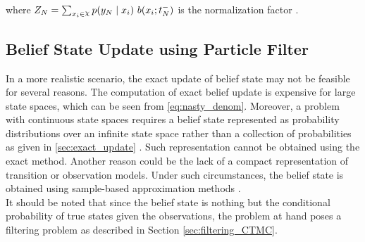 where $ Z_{N} = \sum_{x_{i}\in \rchi} p(y_{N} \mid x_{i})\ b(x_{i}; t_{N}^{-}) $ is the normalization factor \cite{article}.

\subsection{Belief State Update using Particle Filter}
\label{sec:particle_filter}
In a more realistic scenario, the exact update of belief state may not be feasible for several reasons. The computation of exact belief update is expensive for large state spaces, which can be seen from \autoref{eq:nasty_denom}. Moreover, a problem with continuous state spaces requires a belief state represented as probability distributions over an infinite state space rather than a collection of probabilities as given in \cref{sec:exact_update} \cite{Carlo1904}. Such representation cannot be obtained using the exact method. Another reason could be the lack of a compact representation of transition or observation models. Under such circumstances, the belief state is obtained using sample-based approximation methods \cite{Carlo1904}. \\
It should be noted that since the belief state is nothing but the conditional probability of true states given the observations, the problem at hand poses a filtering problem as described in Section \ref{sec:filtering_CTMC}.


